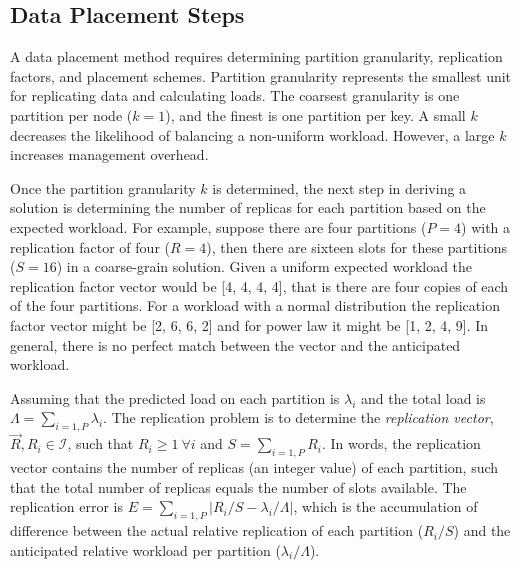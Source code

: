 \subsection{Data Placement Steps}
\label{sec:dp_methods}

A data placement method requires determining
partition granularity, replication factors, and placement schemes.
Partition granularity represents the smallest unit
for replicating data and calculating loads.
The coarsest granularity is one partition per node ($k=1$), and
the finest is one partition per key.
A small $k$ decreases the likelihood of balancing a non-uniform workload.
However, a large $k$ increases management overhead.

Once the partition granularity $k$ is determined,
the next step
in deriving a solution is determining the number of
replicas for each partition based on the expected workload.
For example, suppose there are four partitions ($P=4$) with a
replication factor of four ($R=4$), then
there are sixteen slots for these partitions ($S=16$) in a
coarse-grain solution.
Given a uniform expected workload the replication factor vector would be 
[4, 4, 4, 4], that is there are four copies of each of the four
partitions. 
For a workload with a normal distribution the replication factor
vector might be [2, 6, 6, 2] and for 
power law it might be [1, 2, 4, 9].
In general, there is no perfect match between the vector and the
anticipated workload.

Assuming that the predicted load on each partition is $\lambda_i$ and the total
load is $\Lambda = \sum_{i=1,P}\lambda_i$.
The replication problem is to determine the \emph{replication vector},
$\vec{R}, R_i \in \mathcal{I}$, such that
$R_i \ge 1~\forall i$  and
$S = \sum_{i=1,P}R_i$.
In words, the replication vector contains the number of replicas (an
integer value) of each partition, such that the total number of
replicas equals the number of slots available.
The replication error is
$E = \sum_{i=1,P} | R_i/S - \lambda_i/\Lambda |$, which is the
accumulation of difference between 
the actual relative
replication of each partition ($R_i/S$) and
the anticipated relative
workload per partition ($\lambda_i/\Lambda$).

%

